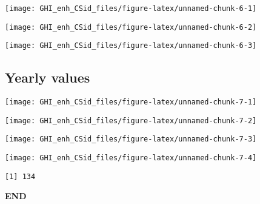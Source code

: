 \documentclass[
  10pt,
  a4paper,oneside]{article}
\begin{document}
\begin{center}\texttt{[image: GHI\_enh\_CSid\_files/figure-latex/unnamed-chunk-6-1]} \end{center}

\begin{center}\texttt{[image: GHI\_enh\_CSid\_files/figure-latex/unnamed-chunk-6-2]} \end{center}

\begin{center}\texttt{[image: GHI\_enh\_CSid\_files/figure-latex/unnamed-chunk-6-3]} \end{center}

\newpage

\subsection{Yearly values}\label{yearly-values}

\begin{center}\texttt{[image: GHI\_enh\_CSid\_files/figure-latex/unnamed-chunk-7-1]} \end{center}

\begin{center}\texttt{[image: GHI\_enh\_CSid\_files/figure-latex/unnamed-chunk-7-2]} \end{center}

\begin{center}\texttt{[image: GHI\_enh\_CSid\_files/figure-latex/unnamed-chunk-7-3]} \end{center}

\begin{center}\texttt{[image: GHI\_enh\_CSid\_files/figure-latex/unnamed-chunk-7-4]} \end{center}

\begin{verbatim}
[1] 134
\end{verbatim}

\textbf{END}
\end{document}
